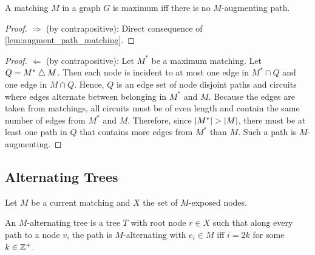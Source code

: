 \begin{theorem}
    A matching $M$ in a graph $G$ is maximum iff there is no $M$-augmenting path. 
    \label{thm:augmenting_path}
\end{theorem}
\begin{proof}
    $\Longrightarrow$ (by contrapositive): Direct consequence of \cref{lem:augment_path_matching}. 
\end{proof}
\begin{proof}
    $\Longleftarrow$ (by contrapositive): Let $M^{\ast}$ be a maximum matching. Let $Q = M^{\ast} \bigtriangleup M$. 
    Then each node is incident to at most one edge in $M^{\ast} \cap Q$ and one edge in $M \cap Q$. Hence, $Q$ is an edge set 
    of node disjoint paths and circuits where edges alternate between belonging in $M^{\ast}$ and $M$. 
    Because the edges are taken from matchings, all circuits must be of even length 
    and contain the same number of edges from $M^{\ast}$ and $M$. Therefore, since $\left\lvert M^{\ast} \right\rvert > \left\lvert M \right\rvert$, 
    there must be at least one path in $Q$ that contains more edges from $M^{\ast}$ than $M$. Such a path is 
    $M$-augmenting. 
\end{proof}

\subsection{Alternating Trees}

Let $M$ be a current matching and $X$ the set of $M$-exposed nodes. 

\begin{definition}
    An $M$-alternating tree is a tree $T$ with root node $r \in X$ such that along every path to a node $v$, 
    the path is $M$-alternating with $e_i \in M$ iff $i = 2k$ for some $k \in \mathbb{Z}^+$. 
    \label{def:alternating_tree}
\end{definition}

